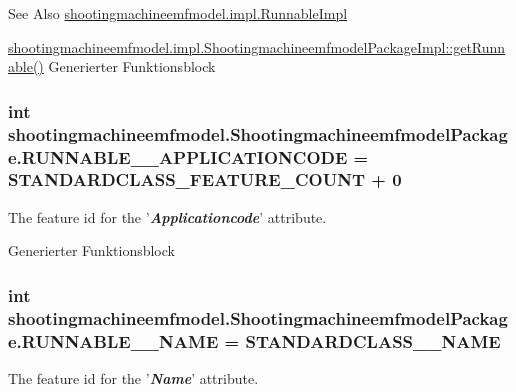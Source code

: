 \begin{DoxySeeAlso}{See Also}
\hyperlink{classshootingmachineemfmodel_1_1impl_1_1_runnable_impl}{shootingmachineemfmodel.\-impl.\-Runnable\-Impl} 

\hyperlink{classshootingmachineemfmodel_1_1impl_1_1_shootingmachineemfmodel_package_impl_ab5b1e51f5d072672e318e4eb83d48e04}{shootingmachineemfmodel.\-impl.\-Shootingmachineemfmodel\-Package\-Impl\-::get\-Runnable()} Generierter Funktionsblock 
\end{DoxySeeAlso}
\hypertarget{interfaceshootingmachineemfmodel_1_1_shootingmachineemfmodel_package_a34bb40e8d42d007591e52746d2998ed8}{
\subsubsection[{R\-U\-N\-N\-A\-B\-L\-E\-\_\-\-\_\-\-A\-P\-P\-L\-I\-C\-A\-T\-I\-O\-N\-C\-O\-D\-E}]{\setlength{\rightskip}{0pt plus 5cm}int shootingmachineemfmodel.\-Shootingmachineemfmodel\-Package.\-R\-U\-N\-N\-A\-B\-L\-E\-\_\-\-\_\-\-A\-P\-P\-L\-I\-C\-A\-T\-I\-O\-N\-C\-O\-D\-E = {\bf S\-T\-A\-N\-D\-A\-R\-D\-C\-L\-A\-S\-S\-\_\-\-F\-E\-A\-T\-U\-R\-E\-\_\-\-C\-O\-U\-N\-T} + 0}}\label{interfaceshootingmachineemfmodel_1_1_shootingmachineemfmodel_package_a34bb40e8d42d007591e52746d2998ed8}
The feature id for the '{\itshape {\bfseries Applicationcode}}' attribute.

Generierter Funktionsblock  \hypertarget{interfaceshootingmachineemfmodel_1_1_shootingmachineemfmodel_package_a68476e164160349167fc28f6ed510d91}{
\subsubsection[{R\-U\-N\-N\-A\-B\-L\-E\-\_\-\-\_\-\-N\-A\-M\-E}]{\setlength{\rightskip}{0pt plus 5cm}int shootingmachineemfmodel.\-Shootingmachineemfmodel\-Package.\-R\-U\-N\-N\-A\-B\-L\-E\-\_\-\-\_\-\-N\-A\-M\-E = {\bf S\-T\-A\-N\-D\-A\-R\-D\-C\-L\-A\-S\-S\-\_\-\-\_\-\-N\-A\-M\-E}}}\label{interfaceshootingmachineemfmodel_1_1_shootingmachineemfmodel_package_a68476e164160349167fc28f6ed510d91}
The feature id for the '{\itshape {\bfseries Name}}' attribute.

